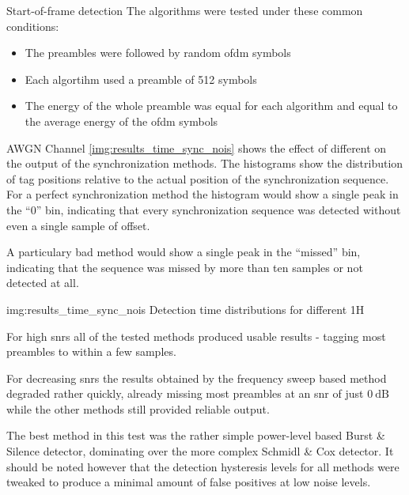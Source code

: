 \begin{subchapter}{Start-of-frame detection}
  \noindent The algorithms were tested under these common conditions:

  \begin{itemize}
    \item
      The preambles were followed by random \gls{ofdm} symbols

    \item
      Each algortihm used a preamble of 512 symbols

    \item
      The energy of the whole preamble was equal for each
      algorithm and equal to the average energy of the \gls{ofdm}
      symbols
  \end{itemize}

  \begin{subsubchapter}{AWGN Channel}
    \autoref{img:results_time_sync_nois} shows the effect of
    different  on the output of the synchronization
    methods.
    The histograms show the distribution of tag positions
    relative to the actual position of the synchronization
    sequence.
    For a perfect synchronization method the histogram would
    show a single peak in the ``$0$'' bin, indicating that every
    synchronization sequence was detected without even a single
    sample of offset.

    A particulary bad method would show a single peak in the
    ``missed'' bin, indicating that the sequence was missed by
    more than ten samples or not detected at all.

                 {img:results_time_sync_nois}
                 {Detection time distributions for different }
                 {1}{H}

    For high \glspl{snr} all of the tested methods produced
    usable results - tagging most preambles to within a few
    samples.

    For decreasing \glspl{snr} the results obtained by the
    frequency sweep based method degraded rather quickly,
    already missing most
    preambles at an \gls{snr} of just $\SI{0}{\deci\bel}$
    while the other methods still provided reliable output.

    The best method in this test was the rather simple
    power-level based Burst \& Silence detector, dominating
    over the more complex Schmidl \& Cox detector.
    It should be noted however that the detection hysteresis levels
    for all methods were tweaked to produce a minimal amount
    of false positives at low noise levels.


\end{subsubchapter}
\end{subchapter}

